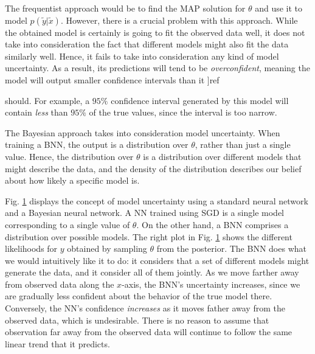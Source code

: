 \documentclass[12pt]{article}
\begin{document}
The frequentist approach would be to find the MAP solution for $\theta$ and use it to model $p(\tilde{y} | \tilde{x})$. However, there is a crucial problem with this approach. While the obtained model is certainly is going to fit the observed data well, it does not take into consideration the fact that different models might also fit the data similarly well. Hence, it fails to take into consideration any kind of model uncertainty. As a result, its predictions will tend to be \textit{overconfident}, meaning the model will output smaller confidence intervals than it ]ref{should. For example, a $95\%$ confidence interval generated by this model will contain \textit{less} than $95\%$ of the true values, since the interval is too narrow.

The Bayesian approach takes into consideration model uncertainty. When training a BNN, the output is a distribution over $\theta$, rather than just a single value. Hence, the distribution over $\theta$ is a distribution over different models that might describe the data, and the density of the distribution describes our belief about how likely a specific model is.

Fig. \ref{fig_1d_predictions_overlaid} displays the concept of model uncertainty using a standard neural network and a Bayesian neural network. A NN trained using SGD is a single model corresponding to a single value of $\theta$. On the other hand, a BNN comprises a distribution over possible models. The right plot in Fig. \ref{fig_1d_predictions_overlaid} shows the different likelihoods for $y$ obtained by sampling $\theta$ from the posterior. The BNN does what we would intuitively like it to do: it considers that a set of different models might generate the data, and it consider all of them jointly. As we move farther away from observed data along the $x$-axis, the BNN's uncertainty increases, since we are gradually less confident about the behavior of the true model there. Conversely, the NN's confidence \textit{increases} as it moves father away from the observed data, which is undesirable. There is no reason to assume that observation far away from the observed data will continue to follow the same linear trend that it predicts.

\begin{figure}[ht]
\centering
{}
\caption{}
\label{fig_1d_predictions_overlaid}
\end{figure}

}
\end{document}
